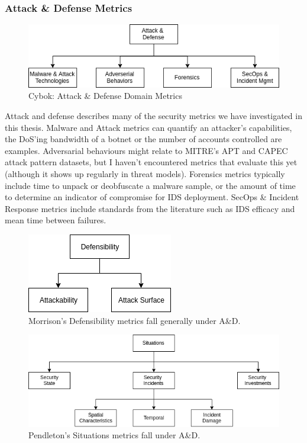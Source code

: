 \subsubsection{Attack \& Defense Metrics}

\begin{figure}[ht]

\begin{mdframed}
\centering
\includegraphics[width=.8\linewidth]{resource/img/ch_background/cybok_metrics/cybok_ad.png}
\end{mdframed}
\caption{Cybok: Attack \& Defense Domain Metrics
\label{fig:background:cybok_ad_metrics}}
\end{figure} 

Attack and defense describes many of the security metrics we have investigated in this thesis. Malware and Attack metrics can quantify an attacker’s capabilities, the DoS’ing bandwidth of a botnet or the number of accounts controlled are examples. Adversarial behaviours might relate to MITRE’s APT and CAPEC attack pattern datasets, but I haven’t encountered metrics that evaluate this yet (although it shows up regularly in threat models). Forensics metrics typically include time to unpack or deobfuscate a malware sample, or the amount of time to determine an indicator of compromise for IDS deployment. SecOps \& Incident Response metrics include standards from the literature such as IDS efficacy and mean time between failures. 

\begin{figure}[ht]
\centering
\includegraphics[width=.35\linewidth]{resource/img/ch_background/cybok_metrics/morrison_defensibility.png}
\caption{Morrison’s Defensibility metrics fall generally under A\&D.
\label{fig:background:cybok_ad_morrison}}
\end{figure} 

\begin{figure}[ht]
\centering
\includegraphics[width=.8\linewidth]{resource/img/ch_background/cybok_metrics/pendleton_situations.png}
\caption{Pendleton’s Situations metrics fall under A\&D.
\label{fig:background:cybok_ad_pendleton}}
\end{figure} 


